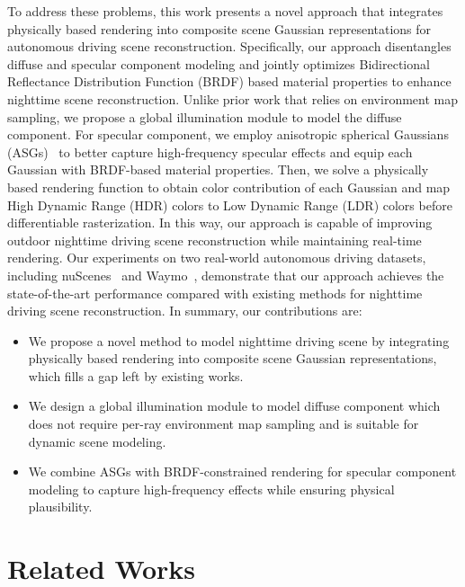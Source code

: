 \documentclass[letterpaper, 10 pt, conference]{ieeeconf}  %
\begin{document}
To address these problems, this work presents a novel approach that integrates physically based rendering into composite scene Gaussian representations for autonomous driving scene reconstruction.
Specifically, our approach disentangles diffuse and specular component modeling and jointly optimizes Bidirectional Reflectance Distribution Function (BRDF) based material properties to enhance nighttime scene reconstruction.
Unlike prior work that relies on environment map sampling, we propose a global illumination module to model the diffuse component.
For specular component, we employ anisotropic spherical Gaussians (ASGs)~\cite{xu2013anisotropic} to better capture high-frequency specular effects and equip each Gaussian with BRDF-based material properties.
Then, we solve a physically based rendering function to obtain color contribution of each Gaussian and map High Dynamic Range (HDR) colors to Low Dynamic Range (LDR) colors before differentiable rasterization.
In this way, our approach is capable of improving outdoor nighttime driving scene reconstruction while maintaining real-time rendering. 
Our experiments on two real-world autonomous driving datasets, including nuScenes~\cite{caesar2020nuscenes} and Waymo~\cite{sun2020scalability}, demonstrate that our approach achieves the state-of-the-art performance compared with existing methods for nighttime driving scene reconstruction.
In summary, our contributions are:
\begin{itemize}
    \item We propose a novel method to model nighttime driving scene by integrating physically based rendering into composite scene Gaussian representations, which fills a gap left by existing works.
    \item We design a global illumination module to model diffuse component which does not require per-ray environment map sampling and is suitable for dynamic scene modeling.
    \item We combine ASGs with BRDF-constrained rendering for specular component modeling to capture high-frequency effects while ensuring physical plausibility.
\end{itemize}



\section{Related Works}
\end{document}
